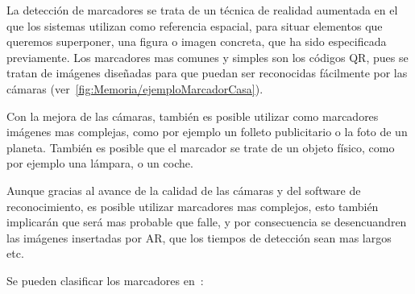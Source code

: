 La detección de marcadores se trata de un técnica de realidad aumentada en el que los sistemas utilizan como referencia espacial, para situar elementos que queremos superponer, una figura o imagen concreta, que ha sido especificada previamente. Los marcadores mas comunes y simples son los códigos QR, pues se tratan de imágenes diseñadas para que puedan ser reconocidas fácilmente por las cámaras (ver~\ref{fig:Memoria/ejemploMarcadorCasa}).


Con la mejora de las cámaras, también es posible utilizar como marcadores imágenes mas complejas, como por ejemplo un folleto publicitario o la foto de un planeta.
También es posible que el marcador se trate de un objeto físico, como por ejemplo una lámpara, o un coche.


Aunque gracias al avance de la calidad de las cámaras y del software de reconocimiento, es posible utilizar marcadores mas complejos, esto también implicarán que será mas probable que falle, y por consecuencia se desencuandren las imágenes insertadas por AR, que los tiempos de detección sean mas largos etc.

Se pueden clasificar los marcadores en~\cite{linowes_babilinski_2017}:



